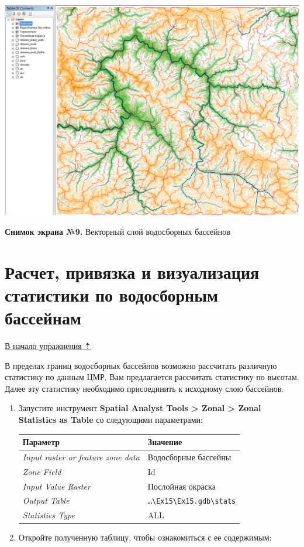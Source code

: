 \documentclass[12pt,]{book}
\begin{document}
\begin{enumerate}
  \includegraphics{images/Ex15/image25.png}

  \textbf{Снимок экрана №9.} Векторный слой водосборных бассейнов
\end{enumerate}

\hypertarget{dem-statistics}{%
\section{Расчет, привязка и визуализация статистики по водосборным бассейнам}\label{dem-statistics}}

\protect\hyperlink{dem}{В начало упражнения ⇡}

В пределах границ водосборных бассейнов возможно рассчитать различную статистику по данным ЦМР. Вам предлагается рассчитать статистику по высотам. Далее эту статистику необходимо присоединить к исходному слою бассейнов.

\begin{enumerate}
\def\labelenumi{\arabic{enumi}.}
\item
  Запустите инструмент \textbf{Spatial Analyst Tools \textgreater{} Zonal \textgreater{} Zonal Statistics as Table} со следующими параметрами:

  \begin{longtable}[]{@{}ll@{}}
  \toprule
  Параметр & Значение\tabularnewline
  \midrule
  \endhead
  \emph{Input raster or feature zone data} & Водосборные бассейны\tabularnewline
  \emph{Zone Field} & Id\tabularnewline
  \emph{Input Value Raster} & Послойная окраска\tabularnewline
  \emph{Output Table} & \texttt{\ldots{}\textbackslash{}Ex15\textbackslash{}Ex15.gdb\textbackslash{}stats}\tabularnewline
  \emph{Statistics Type} & ALL\tabularnewline
  \bottomrule
  \end{longtable}
\item
  Откройте полученную таблицу, чтобы ознакомиться с ее содержимым:
\end{enumerate}
\end{document}
